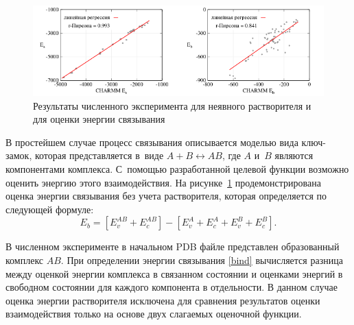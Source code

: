 \begin{figure}[h!]
	\centering
	\includegraphics[width=1.0\linewidth]{images/second.pdf}
	\caption{Результаты численного эксперимента для неявного растворителя и для оценки энергии связывания}
	\label{second}
\end{figure}

В простейшем случае процесс связывания описывается моделью вида ключ-замок, которая представляется в~виде $A+B\leftrightarrow AB$, где $A$ и~$B$ являются компонентами комплекса. С~помощью разработанной целевой функции возможно оценить энергию этого взаимодействия. На рисунке~\ref{second} продемонстрирована оценка энергии связывания без учета растворителя, которая определяется по следующей формуле:
\begin{equation}
	E_{b}=\left[E_{v}^{AB} + E_{c}^{AB}\right] - \left[E_{v}^{A} + E_{c}^{A} + E_{v}^{B} + E_{c}^{B}\right].
	\label{bind}
\end{equation}

В численном эксперименте в начальном PDB файле представлен образованный комплекс $AB$. При определении энергии связывания \eqref{bind} вычисляется разница между оценкой энергии комплекса в связанном состоянии и оценками энергий в свободном состоянии для каждого компонента в отдельности. В данном случае оценка энергии растворителя исключена для сравнения результатов оценки взаимодействия только на основе двух слагаемых оценочной функции.